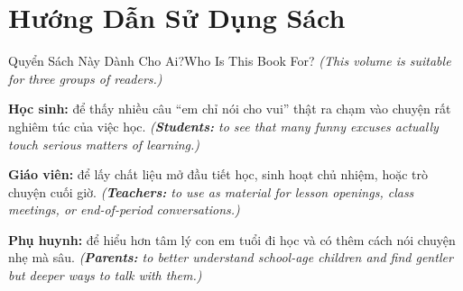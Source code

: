 \chapter*{Hướng Dẫn Sử Dụng Sách}

\begin{truyen}{Quyển Sách Này Dành Cho Ai?}{Who Is This Book For?}
\textit{(This volume is suitable for three groups of readers.)}

\textbf{Học sinh:} để thấy nhiều câu ``em chỉ nói cho vui'' thật ra chạm vào chuyện rất nghiêm túc của việc học.
\textit{(\textbf{Students:} to see that many funny excuses actually touch serious matters of learning.)}

\textbf{Giáo viên:} để lấy chất liệu mở đầu tiết học, sinh hoạt chủ nhiệm, hoặc trò chuyện cuối giờ.
\textit{(\textbf{Teachers:} to use as material for lesson openings, class meetings, or end-of-period conversations.)}

\textbf{Phụ huynh:} để hiểu hơn tâm lý con em tuổi đi học và có thêm cách nói chuyện nhẹ mà sâu.
\textit{(\textbf{Parents:} to better understand school-age children and find gentler but deeper ways to talk with them.)}
\end{truyen}

\vspace{6pt}

